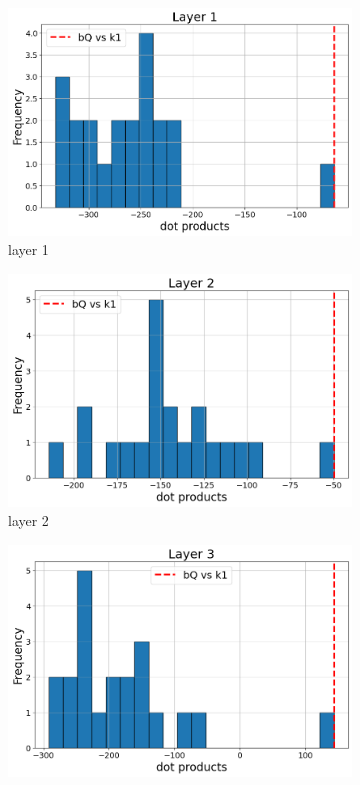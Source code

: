 \documentclass[11pt]{article}
\begin{document}
\begin{figure}[t]
  \begin{subfigure}[t]{0.24\textwidth}
    \centering
    \includegraphics[width=1.4\columnwidth]{figures/obs1_appendix/obs1_layer1.png}
    \caption{layer 1}
  \end{subfigure}\hfill
  \begin{subfigure}[t]{0.24\textwidth}
    \centering
    \includegraphics[width=1.4\columnwidth]{figures/obs1_appendix/obs1_layer2.png}
    \caption{layer 2}
  \end{subfigure}\hfill
  \begin{subfigure}[t]{0.24\textwidth}
    \centering
    \includegraphics[width=1.4\columnwidth]{figures/obs1_appendix/obs1_layer3.png}

\end{subfigure}
\end{figure}
\end{document}
